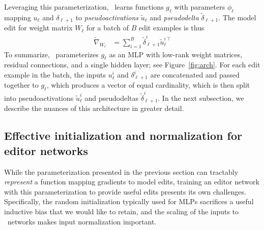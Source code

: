 \documentclass{article}
\begin{document}
Leveraging this parameterization, \name~learns functions $g_\ell$ with parameters $\phi_\ell$ mapping $u_\ell$ and $\delta_{\ell+1}$ to \textit{pseudoactivations} $\tilde u_\ell$ and \textit{pseudodelta} $\tilde\delta_{\ell+1}$. The model edit for weight matrix $W_\ell$ for a batch of $B$ edit examples is thus
\begin{align}
    \tilde{\nabla}_{W_\ell} &= \sum_{i=1}^B\tilde\delta_{\ell + 1}^{i}{\tilde u_\ell^{i\,\top}}
\end{align}
To summarize, \name~parameterizes $g_\ell$ as an MLP with low-rank weight matrices, residual connections, and a single hidden layer; see Figure~\ref{fig:arch}. For each edit example in the batch, the inputs $u_\ell^i$ and $\delta_{\ell+1}^i$ are concatenated and passed together to $g_\ell$, which produces a vector of equal cardinality, which is then split into pseudoactivations $\tilde u_\ell^i$ and pseudodeltas $\tilde \delta_{\ell+1}^i$. In the next subsection, we describe the nuances of this architecture in greater detail. 

\subsection{Effective initialization and normalization for editor networks}
While the parameterization presented in the previous section can tractably \textit{represent} a function mapping gradients to model edits, training an editor network with this parameterization to provide useful edits presents its own challenges. Specifically, the random initialization typically used for MLPs sacrifices a useful inductive bias that we would like to retain, and the scaling of the inputs to \name~networks makes input normalization important.
\end{document}
